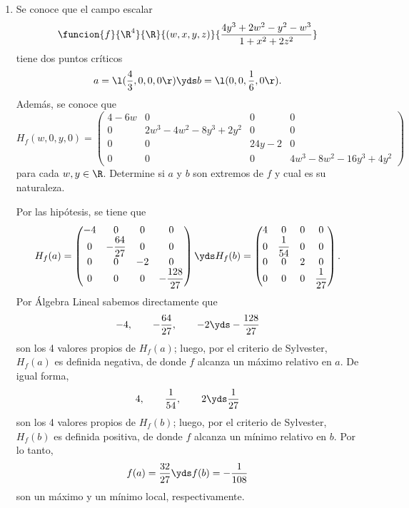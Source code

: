 \documentclass[a4,11pt]{aleph-examen}
\begin{document}
\begin{preguntas}
\begin{respuesta}
\begin{respuesta}
\begin{respuesta}
\begin{enumerate}

\item 
    Se conoce que el campo escalar
    \[
        \funcion{f}{\R^4}{\R}{(w,x,y,z)}{\dfrac{4y^3+2w^2-y^2-w^3}{1+x^2+2z^2}}
    \]
    tiene dos puntos críticos
    \[
        a=\l(\dfrac{4}{3},0,0,0\r)
        \yds
        b=\l(0,0,\dfrac{1}{6},0\r).
    \]
    Además, se conoce que
    \[
        H_f(w,0,y,0)=
        \begin{pmatrix}
        4-6w&0&0&0\\
        0&2w^3-4w^2-8y^3+2y^2&0&0\\
        0&0&24y-2&0\\
        0&0&0&4w^3-8w^2-16y^3+4y^2        
        \end{pmatrix}
    \]
    para cada $w,y\in\R$. Determine si $a$ y $b$ son extremos de $f$ y cual es su naturaleza.
\begin{respuesta}
    Por las hipótesis, se tiene que
    \[
        H_f(a)=
        \begin{pmatrix}
        -4&0&0&0\\
        0&-\dfrac{64}{27}&0&0\\
        0&0&-2&0\\
        0&0&0&-\dfrac{128}{27}        
        \end{pmatrix}
        \yds
        H_f(b)=
        \begin{pmatrix}
        4&0&0&0\\
        0&\dfrac{1}{54}&0&0\\
        0&0&2&0\\
        0&0&0&\dfrac{1}{27}        
        \end{pmatrix}.
    \]
    Por Álgebra Lineal sabemos directamente que
    \[
        -4,
        \qquad 
        -\dfrac{64}{27},
        \qquad
        -2
        \yds
        -\dfrac{128}{27}        
    \]
    son los 4 valores propios de $H_f(a)$; luego, por el criterio de Sylvester, $H_f(a)$ es definida negativa, de donde $f$ alcanza un máximo relativo en $a$. De igual forma, 
    \[
        4,
        \qquad
        \dfrac{1}{54},
        \qquad
        2
        \yds
        \dfrac{1}{27}        
    \]
    son los 4 valores propios de $H_f(b)$; luego, por el criterio de Sylvester, $H_f(b)$ es definida positiva, de donde $f$ alcanza un mínimo relativo en $b$. Por lo tanto,
    \[
        f(a)=\dfrac{32}{27}
        \yds
        f(b)=-\dfrac{1}{108}
    \]
    son un máximo y un mínimo local, respectivamente.
\end{respuesta}


\end{enumerate}
\end{respuesta}
\end{respuesta}
\end{respuesta}
\end{preguntas}
\end{document}
